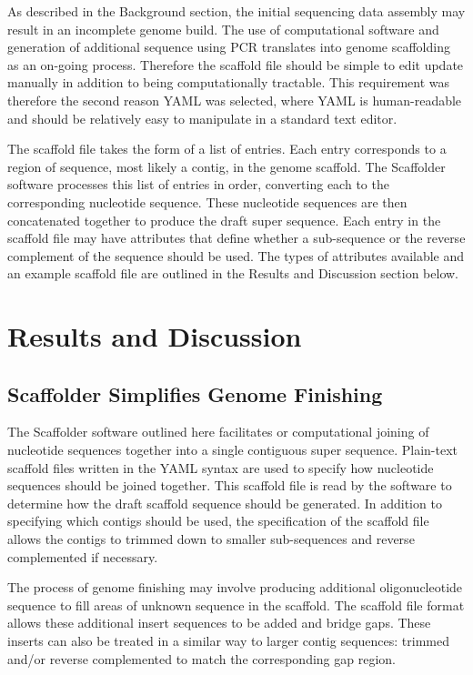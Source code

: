 \documentclass[10pt]{bmc_article}
\newenvironment{bmcformat}{\begin{raggedright}\baselineskip20pt\sloppy\setboolean{publ}{false}}{\end{raggedright}\baselineskip20pt\sloppy}
\begin{document}
\begin{bmcformat}
As described in the Background section, the initial sequencing data assembly
may result in an incomplete genome build. The use of computational software and
generation of additional sequence using PCR translates into genome scaffolding
as an on-going process. Therefore the scaffold file should be simple to edit
update manually in addition to being computationally tractable. This
requirement was therefore the second reason YAML was selected, where YAML is
human-readable and should be relatively easy to manipulate in a standard text
editor. \pb

The scaffold file takes the form of a list of entries. Each entry corresponds
to a region of sequence, most likely a contig, in the genome scaffold. The
Scaffolder software processes this list of entries in order, converting each to
the corresponding nucleotide sequence. These nucleotide sequences are then
concatenated together to produce the draft super sequence. Each entry in the
scaffold file may have attributes that define whether a sub-sequence or the
reverse complement of the sequence should be used. The types of attributes
available and an example scaffold file are outlined in the Results and
Discussion section below.  \pb

\clearpage

\section*{Results and Discussion} %

\subsection*{Scaffolder Simplifies Genome Finishing} %

The Scaffolder software outlined here facilitates or computational joining of
nucleotide sequences together into a single contiguous super sequence.
Plain-text scaffold files written in the YAML syntax are used to specify how
nucleotide sequences should be joined together. This scaffold file is read by
the software to determine how the draft scaffold sequence should be generated.
In addition to specifying which contigs should be used, the specification of
the scaffold file allows the contigs to trimmed down to smaller sub-sequences
and reverse complemented if necessary. \pb

The process of genome finishing may involve producing additional
oligonucleotide sequence to fill areas of unknown sequence in the scaffold.
The scaffold file format allows these additional insert sequences to be added
and bridge gaps. These inserts can also be treated in a similar way to larger
contig sequences: trimmed and/or reverse complemented to match the
corresponding gap region. \pb


\end{bmcformat}
\end{document}
